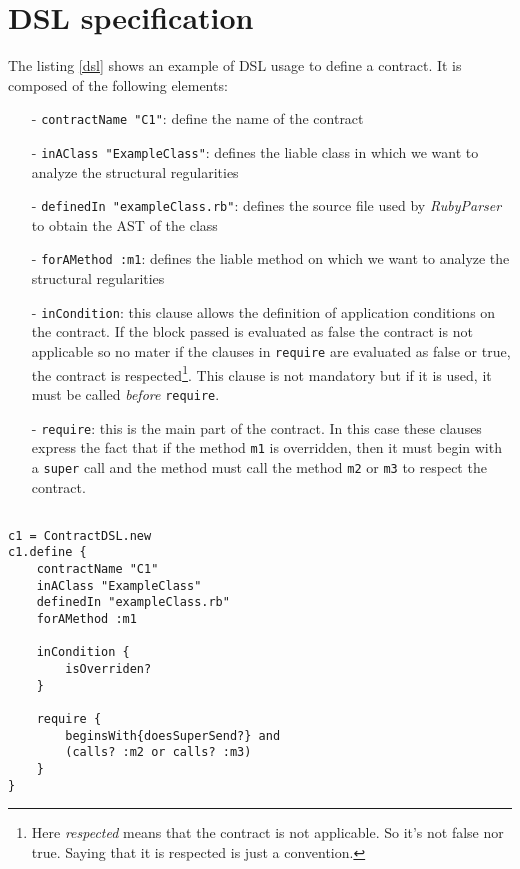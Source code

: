 \section{DSL specification}

The listing \ref{dsl} shows an example of DSL usage to define a contract. It is composed of the following elements:
\begin{enumerate}
	\item[-]\verb+contractName "C1"+: define the name of the contract
	\item[-]\verb+inAClass "ExampleClass"+: defines the liable class in which we want to analyze the structural regularities
	\item[-]\verb+definedIn "exampleClass.rb"+: defines the source file used by \emph{RubyParser} to obtain the AST of the class
	\item[-]\verb+forAMethod :m1+: defines the liable method on which we want to analyze the structural regularities
	\item[-]\verb+inCondition+: this clause allows the definition of application conditions on the contract. If the block passed is evaluated as false the contract is not applicable so no mater if the clauses in \verb+require+ are evaluated as false or true, the contract is respected\footnote{Here \emph{respected} means that the contract is not applicable. So it's not false nor true. Saying that it is respected is just a convention.}. This clause is not mandatory but if it is used, it must be called \emph{before} \verb+require+.
	\item[-]\verb+require+: this is the main part of the contract. In this case these clauses express the fact that if the method \verb+m1+ is overridden, then it must begin with a \verb+super+ call and the method must call the method \verb+m2+ or \verb+m3+ to respect the contract.
\end{enumerate}

\lstset{
	language=Ruby,        %
	tabsize=3,
	basicstyle = \small \ttfamily,
	basewidth=0.5em
}
\begin{lstlisting}[frame=single, caption=example of a DSL usage to define a contract, captionpos=b, label=dsl]  % Start your code-block

c1 = ContractDSL.new
c1.define {
    contractName "C1"
    inAClass "ExampleClass"
    definedIn "exampleClass.rb"
    forAMethod :m1
    
    inCondition { 
        isOverriden?
    }
    
    require {
    	beginsWith{doesSuperSend?} and
		(calls? :m2 or calls? :m3)
    }
}
\end{lstlisting}